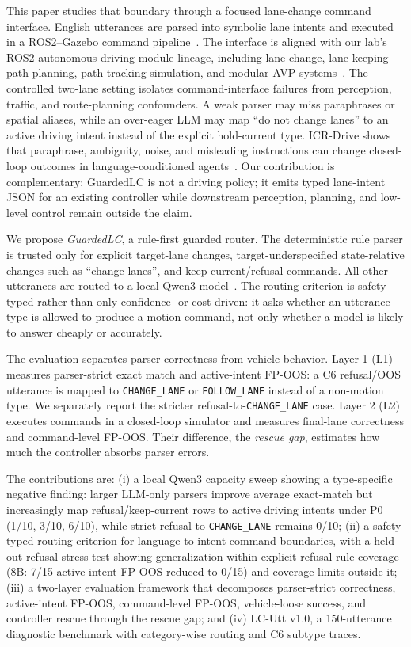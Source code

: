 \documentclass[conference]{IEEEtran}
\newcommand{\ours}{GuardedLC}
\begin{document}
This paper studies that boundary through a focused lane-change command interface. English utterances are parsed into symbolic lane intents and executed in a ROS2--Gazebo command pipeline~\cite{ros2,gazebo}. The interface is aligned with our lab's ROS2 autonomous-driving module lineage, including lane-change, lane-keeping path planning, path-tracking simulation, and modular AVP systems~\cite{skku_lanechange2024,skku_spline2025,skku_pathtracking2025,skku_avp2025}. The controlled two-lane setting isolates command-interface failures from perception, traffic, and route-planning confounders. A weak parser may miss paraphrases or spatial aliases, while an over-eager LLM may map ``do not change lanes'' to an active driving intent instead of the explicit hold-current type. ICR-Drive shows that paraphrase, ambiguity, noise, and misleading instructions can change closed-loop outcomes in language-conditioned agents~\cite{icrdrive}. Our contribution is complementary: \ours{} is not a driving policy; it emits typed lane-intent JSON for an existing controller while downstream perception, planning, and low-level control remain outside the claim.

We propose \emph{\ours}, a rule-first guarded router. The deterministic rule parser is trusted only for explicit target-lane changes, target-underspecified state-relative changes such as ``change lanes'', and keep-current/refusal commands. All other utterances are routed to a local Qwen3 model~\cite{qwen3}. The routing criterion is safety-typed rather than only confidence- or cost-driven: it asks whether an utterance type is allowed to produce a motion command, not only whether a model is likely to answer cheaply or accurately.

The evaluation separates parser correctness from vehicle behavior. Layer 1 (L1) measures parser-strict exact match and active-intent FP-OOS: a C6 refusal/OOS utterance is mapped to \texttt{CHANGE\_LANE} or \texttt{FOLLOW\_LANE} instead of a non-motion type. We separately report the stricter refusal-to-\texttt{CHANGE\_LANE} case. Layer 2 (L2) executes commands in a closed-loop simulator and measures final-lane correctness and command-level FP-OOS. Their difference, the \emph{rescue gap}, estimates how much the controller absorbs parser errors.

The contributions are: (i) a local Qwen3 capacity sweep showing a type-specific negative finding: larger LLM-only parsers improve average exact-match but increasingly map refusal/keep-current rows to active driving intents under P0 (1/10, 3/10, 6/10), while strict refusal-to-\texttt{CHANGE\_LANE} remains 0/10; (ii) a safety-typed routing criterion for language-to-intent command boundaries, with a held-out refusal stress test showing generalization within explicit-refusal rule coverage (8B: 7/15 active-intent FP-OOS reduced to 0/15) and coverage limits outside it; (iii) a two-layer evaluation framework that decomposes parser-strict correctness, active-intent FP-OOS, command-level FP-OOS, vehicle-loose success, and controller rescue through the rescue gap; and (iv) LC-Utt v1.0, a 150-utterance diagnostic benchmark with category-wise routing and C6 subtype traces.
\end{document}
